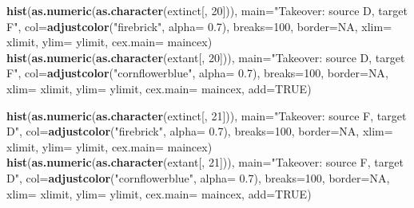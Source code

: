 \documentclass[]{book}
\newenvironment{Shaded}{\begin{snugshade}}{\end{snugshade}}
\newcommand{\KeywordTok}[1]{\textcolor[rgb]{0.13,0.29,0.53}{\textbf{{#1}}}}
\newcommand{\DataTypeTok}[1]{\textcolor[rgb]{0.13,0.29,0.53}{{#1}}}
\newcommand{\DecValTok}[1]{\textcolor[rgb]{0.00,0.00,0.81}{{#1}}}
\newcommand{\FloatTok}[1]{\textcolor[rgb]{0.00,0.00,0.81}{{#1}}}
\newcommand{\StringTok}[1]{\textcolor[rgb]{0.31,0.60,0.02}{{#1}}}
\newcommand{\OtherTok}[1]{\textcolor[rgb]{0.56,0.35,0.01}{{#1}}}
\newcommand{\NormalTok}[1]{{#1}}
\theoremstyle{definition}
\theoremstyle{definition}
\theoremstyle{definition}
\theoremstyle{remark}
\begin{document}
\begin{Shaded}
\begin{Highlighting}[]
\KeywordTok{hist}\NormalTok{(}\KeywordTok{as.numeric}\NormalTok{(}\KeywordTok{as.character}\NormalTok{(extinct[, }\DecValTok{20}\NormalTok{])), }\DataTypeTok{main=}\StringTok{"Takeover: source D, target F"}\NormalTok{, }\DataTypeTok{col=}\KeywordTok{adjustcolor}\NormalTok{(}\StringTok{"firebrick"}\NormalTok{, }\DataTypeTok{alpha=} \FloatTok{0.7}\NormalTok{), }\DataTypeTok{breaks=}\DecValTok{100}\NormalTok{, }\DataTypeTok{border=}\OtherTok{NA}\NormalTok{, }\DataTypeTok{xlim=}\NormalTok{ xlimit, }\DataTypeTok{ylim=}\NormalTok{ ylimit, }\DataTypeTok{cex.main=}\NormalTok{ maincex)}
\KeywordTok{hist}\NormalTok{(}\KeywordTok{as.numeric}\NormalTok{(}\KeywordTok{as.character}\NormalTok{(extant[, }\DecValTok{20}\NormalTok{])), }\DataTypeTok{main=}\StringTok{"Takeover: source D, target F"}\NormalTok{, }\DataTypeTok{col=}\KeywordTok{adjustcolor}\NormalTok{(}\StringTok{"cornflowerblue"}\NormalTok{, }\DataTypeTok{alpha=} \FloatTok{0.7}\NormalTok{), }\DataTypeTok{breaks=}\DecValTok{100}\NormalTok{, }\DataTypeTok{border=}\OtherTok{NA}\NormalTok{, }\DataTypeTok{xlim=}\NormalTok{ xlimit, }\DataTypeTok{ylim=}\NormalTok{ ylimit, }\DataTypeTok{cex.main=}\NormalTok{ maincex, }\DataTypeTok{add=}\OtherTok{TRUE}\NormalTok{)}

\KeywordTok{hist}\NormalTok{(}\KeywordTok{as.numeric}\NormalTok{(}\KeywordTok{as.character}\NormalTok{(extinct[, }\DecValTok{21}\NormalTok{])), }\DataTypeTok{main=}\StringTok{"Takeover: source F, target D"}\NormalTok{, }\DataTypeTok{col=}\KeywordTok{adjustcolor}\NormalTok{(}\StringTok{"firebrick"}\NormalTok{, }\DataTypeTok{alpha=} \FloatTok{0.7}\NormalTok{), }\DataTypeTok{breaks=}\DecValTok{100}\NormalTok{, }\DataTypeTok{border=}\OtherTok{NA}\NormalTok{, }\DataTypeTok{xlim=}\NormalTok{ xlimit, }\DataTypeTok{ylim=}\NormalTok{ ylimit, }\DataTypeTok{cex.main=}\NormalTok{ maincex)}
\KeywordTok{hist}\NormalTok{(}\KeywordTok{as.numeric}\NormalTok{(}\KeywordTok{as.character}\NormalTok{(extant[, }\DecValTok{21}\NormalTok{])), }\DataTypeTok{main=}\StringTok{"Takeover: source F, target D"}\NormalTok{, }\DataTypeTok{col=}\KeywordTok{adjustcolor}\NormalTok{(}\StringTok{"cornflowerblue"}\NormalTok{, }\DataTypeTok{alpha=} \FloatTok{0.7}\NormalTok{), }\DataTypeTok{breaks=}\DecValTok{100}\NormalTok{, }\DataTypeTok{border=}\OtherTok{NA}\NormalTok{, }\DataTypeTok{xlim=}\NormalTok{ xlimit, }\DataTypeTok{ylim=}\NormalTok{ ylimit, }\DataTypeTok{cex.main=}\NormalTok{ maincex, }\DataTypeTok{add=}\OtherTok{TRUE}\NormalTok{)}


\end{Highlighting}
\end{Shaded}
\end{document}

